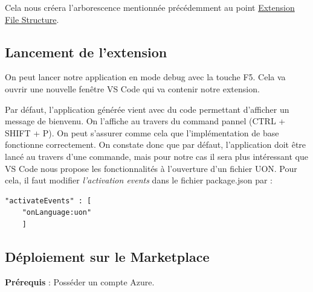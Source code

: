 \documentclass[
    iict, %
    il, %
]{heig-tb}
\begin{document}
Cela nous créera l'arborescence mentionnée précédemment au point \hyperref[Extension File Structure]{Extension File Structure}.

\subsection{Lancement de l'extension}
On peut lancer notre application en mode debug avec la touche F5. Cela va ouvrir une nouvelle fenêtre VS Code qui va contenir notre extension.

Par défaut, l'application générée vient avec du code permettant d'afficher un message de bienvenu. On l'affiche au travers du command pannel (CTRL + SHIFT + P). On peut s'assurer comme cela que l'implémentation de base fonctionne correctement.
On constate donc que par défaut, l'application doit être lancé au travers d'une commande, mais pour notre cas il sera plus intéressant que VS Code nous propose les fonctionnalités à l'ouverture d'un fichier UON.
Pour cela, il faut modifier \emph{l'activation events} dans le fichier package.json par :
\begin{lstlisting}[frame=single]
    "activateEvents" : [
	"onLanguage:uon"
    ]
\end{lstlisting}

\subsection{Déploiement sur le Marketplace}


\textbf{Prérequis} : Posséder un compte Azure.
\end{document}
